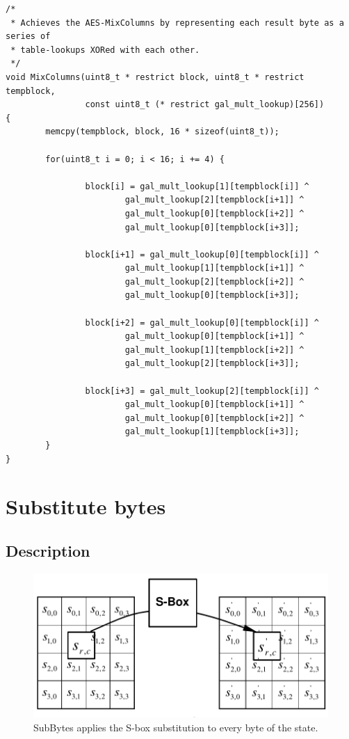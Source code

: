 \begin{lstlisting}
/*
 * Achieves the AES-MixColumns by representing each result byte as a series of
 * table-lookups XORed with each other.
 */
void MixColumns(uint8_t * restrict block, uint8_t * restrict tempblock,
                const uint8_t (* restrict gal_mult_lookup)[256])
{
        memcpy(tempblock, block, 16 * sizeof(uint8_t));

        for(uint8_t i = 0; i < 16; i += 4) {

                block[i] = gal_mult_lookup[1][tempblock[i]] ^
                        gal_mult_lookup[2][tempblock[i+1]] ^
                        gal_mult_lookup[0][tempblock[i+2]] ^
                        gal_mult_lookup[0][tempblock[i+3]];

                block[i+1] = gal_mult_lookup[0][tempblock[i]] ^
                        gal_mult_lookup[1][tempblock[i+1]] ^
                        gal_mult_lookup[2][tempblock[i+2]] ^
                        gal_mult_lookup[0][tempblock[i+3]];

                block[i+2] = gal_mult_lookup[0][tempblock[i]] ^
                        gal_mult_lookup[0][tempblock[i+1]] ^
                        gal_mult_lookup[1][tempblock[i+2]] ^
                        gal_mult_lookup[2][tempblock[i+3]];

                block[i+3] = gal_mult_lookup[2][tempblock[i]] ^
                        gal_mult_lookup[0][tempblock[i+1]] ^
                        gal_mult_lookup[0][tempblock[i+2]] ^
                        gal_mult_lookup[1][tempblock[i+3]];
        }
}
\end{lstlisting}



\hypertarget{substitute-bytes}{%
\section{Substitute bytes}\label{substitute-bytes}}

\hypertarget{description-5}{%
\subsection{Description}\label{description-5}}

\begin{figure}
\centering
\includegraphics[scale = 0.3]{data/figures/subbytes.png}
\caption{SubBytes applies the S-box substitution to every byte of the
state. \cite[ch. 5.1.1.]{aes2001}}
\end{figure}

